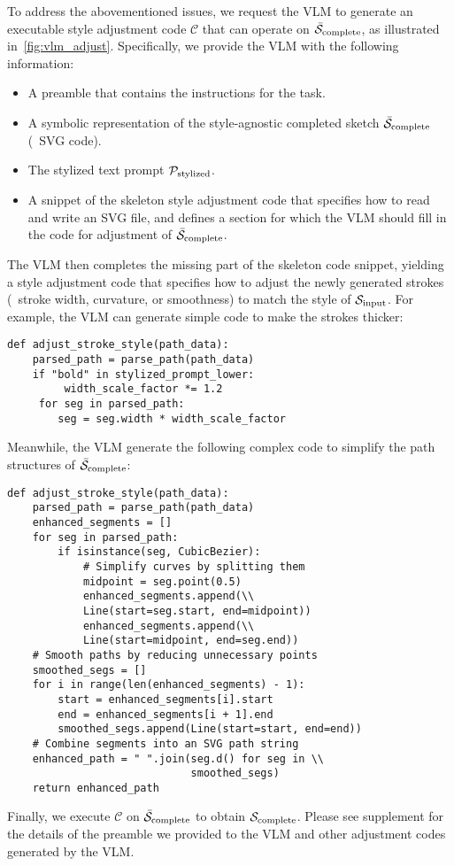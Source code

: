 
To address the abovementioned issues, we request the VLM to generate an executable style adjustment code $\mathcal{C}$ that can operate on $\mathcal{\bar{S}}_{\mathrm{complete}}$, as illustrated in~\cref{fig:vlm_adjust}.
Specifically, we provide the VLM with the following information:
\begin{itemize}
    \item A preamble that contains the instructions for the task.
    \item A symbolic representation of the style-agnostic completed sketch $\mathcal{\bar{S}}_{\mathrm{complete}}$ (\eg~SVG code).
    \item The stylized text prompt $\mathcal{P}_{\mathrm{stylized}}$.
    \item A snippet of the skeleton style adjustment code that specifies how to read and write an SVG file, and defines a section for which the VLM should fill in the code for adjustment of $\mathcal{\bar{S}}_{\mathrm{complete}}$. 
\end{itemize}
The VLM then completes the missing part of the skeleton code snippet, yielding a style adjustment code that specifies how to adjust the newly generated strokes (\eg~stroke width, curvature, or smoothness) to match the style of $\mathcal{S}_{\mathrm{input}}$.
For example, the VLM can generate simple code to make the strokes thicker:
\begin{verbatim}
def adjust_stroke_style(path_data):
    parsed_path = parse_path(path_data)
    if "bold" in stylized_prompt_lower:
         width_scale_factor *= 1.2   
     for seg in parsed_path:
        seg = seg.width * width_scale_factor
\end{verbatim}
Meanwhile, the VLM generate the following complex code to simplify the path structures of $\mathcal{\bar{S}}_{\mathrm{complete}}$:
\begin{verbatim}
def adjust_stroke_style(path_data):
    parsed_path = parse_path(path_data)
    enhanced_segments = []
    for seg in parsed_path:
        if isinstance(seg, CubicBezier):
            # Simplify curves by splitting them
            midpoint = seg.point(0.5)
            enhanced_segments.append(\\ 
            Line(start=seg.start, end=midpoint))
            enhanced_segments.append(\\
            Line(start=midpoint, end=seg.end))
    # Smooth paths by reducing unnecessary points
    smoothed_segs = []
    for i in range(len(enhanced_segments) - 1):
        start = enhanced_segments[i].start
        end = enhanced_segments[i + 1].end
        smoothed_segs.append(Line(start=start, end=end))
    # Combine segments into an SVG path string
    enhanced_path = " ".join(seg.d() for seg in \\
                             smoothed_segs)
    return enhanced_path
\end{verbatim}

Finally, we execute $\mathcal{C}$ on $\mathcal{\bar{S}}_{\mathrm{complete}}$ to obtain $\mathcal{S}_{\mathrm{complete}}$.
Please see supplement for the details of the preamble we provided to the VLM and other adjustment codes generated by the VLM.


        





